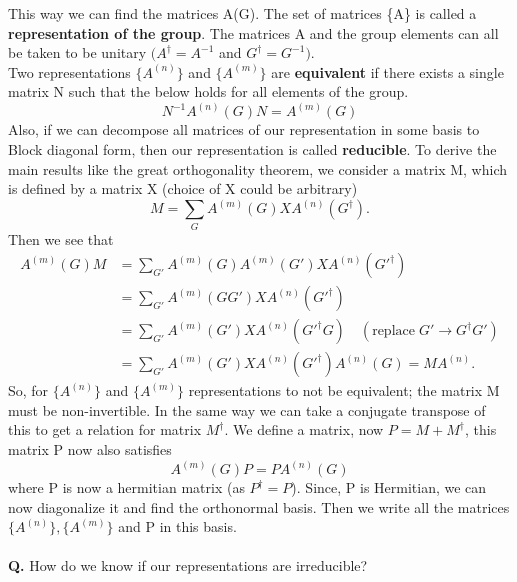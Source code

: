 \documentclass{article}
\begin{document}
	This way we can find the matrices A(G). The set of matrices \{A\} is called a \textbf{representation of the group}. The matrices A and the group elements can all be taken to be unitary $(A^\dagger = A^{-1}$ and $G^\dagger = G^{-1})$. \\
	Two representations $\{A^{(n)}\}$ and $\{A^{(m)}\}$ are \textbf{equivalent} if there exists a single matrix N such that the below holds for all elements of the group.
	\begin{equation}
		N^{-1} A^{(n)} (G) N =  A^{(m)}(G)
	\end{equation} 
	Also, if we can decompose all matrices of our representation in some basis to Block diagonal form, then our representation is called \textbf{reducible}. To derive the main results like the great orthogonality theorem, we consider a matrix M, which is defined by a matrix X (choice of X could be arbitrary)
	\begin{equation}\label{Eqn:define-M}
		M = \sum_G  A^{(m)}(G) X  A^{(n)}(G^\dagger).
	\end{equation}
	Then we see that
	\begin{equation}\label{Eqn:relation between representations}
		\begin{split}
			 A^{(m)}(G) M &= \sum_{G'} A^{(m)}(G) A^{(m)}(G') X  A^{(n)}(G'^\dagger)\\
			 &= \sum_{G'} A^{(m)}(GG') X  A^{(n)}(G'^\dagger)\\
			 &= \sum_{G'} A^{(m)}(G') X  A^{(n)}(G'^\dagger G) \quad (\mathrm{replace} \; G' \to G^\dagger G')\\
			  &= \sum_{G'} A^{(m)}(G') X  A^{(n)}(G'^\dagger)A^{(n)}( G) = MA^{(n)}.
		\end{split}
	\end{equation}
	So, for $\{A^{(n)}\}$ and $\{A^{(m)}\}$ representations to not be equivalent; the matrix M must be non-invertible. In the same way we can take a conjugate transpose of this to get a relation for matrix $M^\dagger$. We define a matrix, now $P = M + M^\dagger$, this matrix P now also satisfies
	\begin{equation}
		A^{(m)}(G) P = P A^{(n)}(G) 
	\end{equation}
	where P is now a hermitian matrix (as $P^\dagger = P$). Since, P is Hermitian, we can now diagonalize it and find the orthonormal basis. Then we write all the matrices $\{A^{(n)}\},\{A^{(m)}\}$ and P in this basis.\\\\
	\textbf{Q.} How do we know if our representations are irreducible?\\
\end{document}
